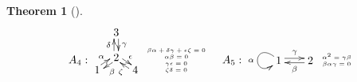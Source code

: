 \documentclass[12pt]{amsart}
\newtheorem{thm}{Theorem}[section]
\numberwithin{equation}{thm}
\begin{document}
{\begin{thm}[{\cite[Theorem, Theorem]{S}}]
\[\begin{array}{c}
\begin{array}{lll}
&

A_4:
\begin{xy}
(0,-3) *[o]+{1}="A", (6,1) *[o]+{2}="B", (6,9) *[o]+{3}="C", (12,-3) *[o]+{4}="D", 
\ar @<2pt>"A";"B"^{\alpha}
\ar @<2pt>"B";"A"^{\beta}
\ar @<2pt>"B";"C"^{\delta}
\ar @<2pt>"C";"B"^{\gamma}
\ar @<2pt>"B";"D"^{\epsilon}
\ar @<2pt>"D";"B"^{\zeta}
\end{xy}
{\tiny \begin{array}{c}
  \beta\alpha+\delta\gamma+\epsilon\zeta=0 \\
  \alpha\beta=0 \\
  \gamma\epsilon=0 \\
 \zeta\delta=0 \\
 \end{array}
}

&

A_5:
\begin{xy}
(0,0) *[o]+{1}="A", (10,0) *[o]+{2}="B",
\ar @(lu,ld) "A";"A"_{\alpha}
\ar @<2pt> "A";"B"^{\gamma}
\ar @<2pt> "B";"A"^{\beta}
\end{xy}
\tiny{ \begin{array}{c}
  \alpha^2=\gamma\beta \\
 \beta\alpha\gamma=0 \\
\end{array}
}\\\\


\end{array}
\end{array}\]
\end{thm}}
\end{document}
